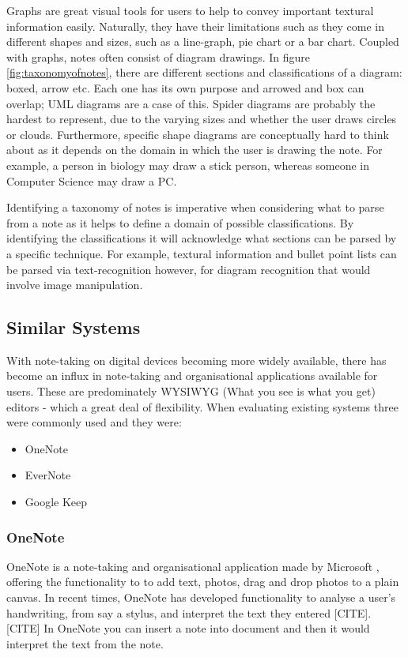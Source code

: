 Graphs are great visual tools for users to help to convey important textural information easily. Naturally, they have their limitations such as they come in different shapes and sizes, such as a line-graph, pie chart or a bar chart. Coupled with graphs, notes often consist of diagram drawings.  In figure \ref{fig:taxonomyofnotes}, there are different sections and classifications of a diagram: boxed, arrow etc. Each one has its own purpose and arrowed and box can overlap; UML diagrams are a case of this. Spider diagrams are probably the hardest to represent, due to the varying sizes and whether the user draws circles or clouds. Furthermore, specific shape diagrams are conceptually hard to think about as it depends on the domain in which the user is drawing the note. For example, a person in biology may draw a stick person, whereas someone in Computer Science may draw a PC.

Identifying a taxonomy of notes is imperative when considering what to parse from a note as it helps to define a domain of possible classifications. By identifying the classifications it will acknowledge what sections can be parsed by a specific technique. For example, textural information and bullet point lists can be parsed via text-recognition however, for diagram recognition that would involve image manipulation.




\subsection{Similar Systems}
With note-taking on digital devices becoming more widely available, there has become an influx in note-taking and organisational applications available for users. These are predominately WYSIWYG (What you see is what you get) editors - which a great deal of flexibility. When evaluating existing systems three were commonly used and they were:
\begin{itemize}
  \item OneNote
  \item EverNote
  \item Google Keep
\end{itemize}

\subsubsection{OneNote}
OneNote is a note-taking and organisational application made by Microsoft  \cite{citeulike:onenote}, offering the functionality to to add text, photos, drag and drop photos to a plain canvas. In recent times, OneNote has developed functionality to analyse a user's handwriting, from say a stylus, and interpret the text they entered [CITE]. [CITE] In OneNote you can insert a note into document and then it would interpret the text from the note.

